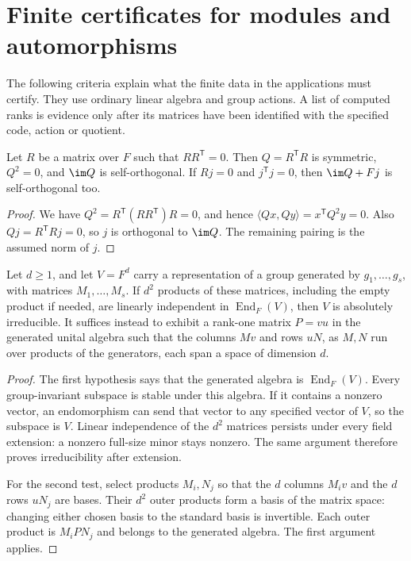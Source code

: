 \section{Finite certificates for modules and automorphisms}

The following criteria explain what the finite data in the applications
must certify. They use ordinary linear algebra and group actions. A list
of computed ranks is evidence only after its matrices have been identified
with the specified code, action or quotient.

\begin{lemma}\label{ULCD.SquareZeroIncidence}
Let $R$ be a matrix over $F$ such that $RR^{\mathsf T}=0$. Then
$Q=R^{\mathsf T}R$ is symmetric, $Q^2=0$, and $\im Q$ is self-orthogonal.
If $Rj=0$ and $j^{\mathsf T}j=0$, then $\im Q+Fj$ is self-orthogonal too.
\end{lemma}
\begin{proof}
We have $Q^2=R^{\mathsf T}(RR^{\mathsf T})R=0$, and hence
$\langle Qx,Qy\rangle=x^{\mathsf T}Q^2y=0$.
Also $Qj=R^{\mathsf T}Rj=0$, so $j$ is orthogonal to $\im Q$.
The remaining pairing is the assumed norm of $j$.
\end{proof}

\begin{theorem}\label{ULCD.MatrixAlgebra}
Let $d\geq1$, and let $V=F^d$ carry a representation of a group generated by
$g_1,\ldots,g_s$, with matrices $M_1,\ldots,M_s$.
If $d^2$ products of these matrices, including the empty product if needed,
are linearly independent in $\operatorname{End}_F(V)$, then $V$ is
absolutely irreducible.
It suffices instead to exhibit a rank-one matrix $P=vu$ in the generated
unital algebra such that the columns $Mv$ and rows $uN$, as $M,N$ run
over products of the generators, each span a space of dimension $d$.
\end{theorem}
\begin{proof}
The first hypothesis says that the generated algebra is
$\operatorname{End}_F(V)$. Every group-invariant subspace is stable under
this algebra. If it contains a nonzero vector, an endomorphism can send
that vector to any specified vector of $V$, so the subspace is $V$.
Linear independence of the $d^2$ matrices persists under every field
extension: a nonzero full-size minor stays nonzero. The same argument
therefore proves irreducibility after extension.

For the second test, select products $M_i,N_j$ so that the $d$ columns
$M_iv$ and the $d$ rows $uN_j$ are bases. Their $d^2$ outer products
form a basis of the matrix space: changing either chosen basis to the
standard basis is invertible. Each outer product is $M_iPN_j$ and belongs
to the generated algebra. The first argument applies.
\end{proof}

